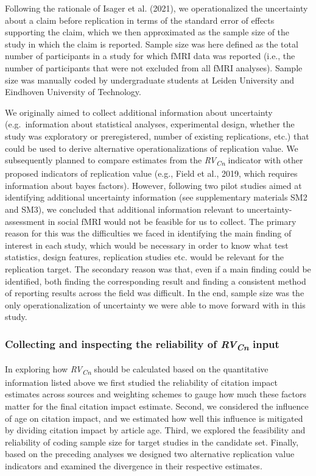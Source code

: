 \documentclass[
  man,floatsintext]{apa6}
\begin{document}
Following the rationale of Isager et al. (2021), we operationalized the uncertainty about a claim before replication in terms of the standard error of effects supporting the claim, which we then approximated as the sample size of the study in which the claim is reported. Sample size was here defined as the total number of participants in a study for which fMRI data was reported (i.e., the number of participants that were not excluded from all fMRI analyses). Sample size was manually coded by undergraduate students at Leiden University and Eindhoven University of Technology.

We originally aimed to collect additional information about uncertainty (e.g.~information about statistical analyses, experimental design, whether the study was exploratory or preregistered, number of existing replications, etc.) that could be used to derive alternative operationalizations of replication value. We subsequently planned to compare estimates from the \emph{RV\textsubscript{Cn}} indicator with other proposed indicators of replication value (e.g., Field et al., 2019, which requires information about bayes factors). However, following two pilot studies aimed at identifying additional uncertainty information (see supplementary materials SM2 and SM3), we concluded that additional information relevant to uncertainty-assessment in social fMRI would not be feasible for us to collect. The primary reason for this was the difficulties we faced in identifying the main finding of interest in each study, which would be necessary in order to know what test statistics, design features, replication studies etc. would be relevant for the replication target. The secondary reason was that, even if a main finding could be identified, both finding the corresponding result and finding a consistent method of reporting results across the field was difficult. In the end, sample size was the only operationalization of uncertainty we were able to move forward with in this study.

\hypertarget{collecting-and-inspecting-the-reliability-of-rvcn-input}{%
\subsubsection{\texorpdfstring{Collecting and inspecting the reliability of \emph{RV\textsubscript{Cn}} input}{Collecting and inspecting the reliability of RVCn input}}\label{collecting-and-inspecting-the-reliability-of-rvcn-input}}

In exploring how \emph{RV\textsubscript{Cn}} should be calculated based on the quantitative information listed above we first studied the reliability of citation impact estimates across sources and weighting schemes to gauge how much these factors matter for the final citation impact estimate. Second, we considered the influence of age on citation impact, and we estimated how well this influence is mitigated by dividing citation impact by article age. Third, we explored the feasibility and reliability of coding sample size for target studies in the candidate set. Finally, based on the preceding analyses we designed two alternative replication value indicators and examined the divergence in their respective estimates.
\end{document}
